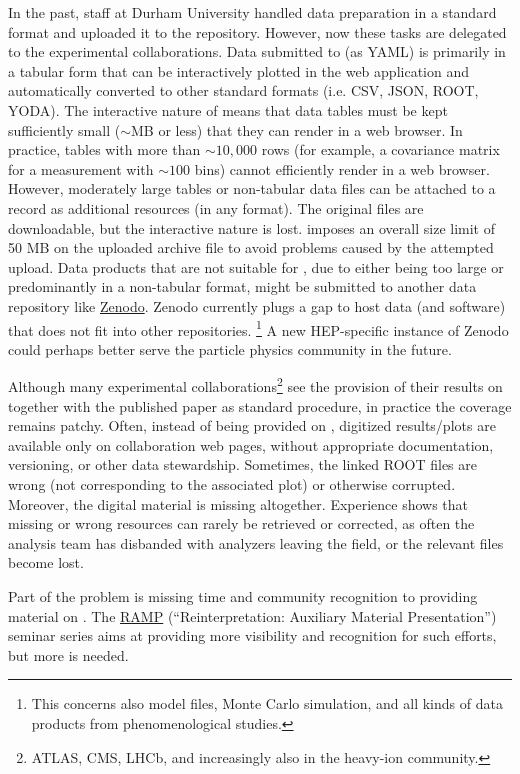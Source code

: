 \documentclass[11pt]{article}
\begin{document}
In the past, \hepdata staff at Durham University handled data preparation in a standard format and uploaded it to the repository.
However, now these tasks are delegated to the experimental collaborations.
Data submitted to \hepdata (as YAML) is primarily in a tabular form that can be interactively plotted in the web application and automatically converted to other standard formats (i.e. CSV, JSON, ROOT, YODA).
The interactive nature of \hepdata means that data tables must be kept sufficiently small ($\sim$MB or less) that they can render in a web browser.
In practice, tables with more than $\sim 10,000$ rows (for example, a covariance matrix for a measurement with $\sim 100$ bins) cannot efficiently render in a web browser.
However, moderately large tables or non-tabular data files can be attached to a \hepdata record as additional resources (in any format).
The original files are downloadable, but the interactive nature is lost.
\hepdata imposes an overall size limit of 50 MB on the uploaded archive file to avoid problems caused by the attempted upload. 
%
Data products that are not suitable for \hepdata, due to either being too large or predominantly in a non-tabular format, might be submitted to another data repository like \href{https://zenodo.org/}{Zenodo}.
Zenodo currently plugs a gap to host data (and software) that does not fit into other repositories.%
\footnote{This concerns also model files, Monte Carlo simulation, and all kinds of data products from phenomenological studies.}
A new HEP-specific instance of Zenodo could perhaps better serve the particle physics community in the future.


Although many experimental collaborations\footnote{ATLAS, CMS, LHCb, and increasingly also in the heavy-ion community.} see the provision of their results on \hepdata together with the published paper as standard procedure, in practice the coverage remains patchy. 
Often, instead of being provided on \hepdata, digitized results/plots are available only on collaboration web pages, without appropriate documentation, versioning, or other data stewardship.
Sometimes, the linked ROOT files are wrong (not corresponding to the associated plot) or otherwise corrupted.
Moreover, the digital material is missing altogether.
Experience shows that missing or wrong resources can rarely be retrieved or corrected, as often the analysis team has disbanded with analyzers leaving the field, or the relevant files become lost. 

Part of the problem is missing time and community recognition to providing material on \hepdata.
The \href{https://indico.cern.ch/category/14155/}{RAMP} (``Reinterpretation: Auxiliary Material Presentation'') seminar series aims at providing more visibility and recognition for such efforts,  but more is needed. 
\end{document}
